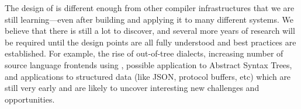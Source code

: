 The design of \MLIR is different enough from other compiler infrastructures that
we are still learning---even after building and applying it to many different
systems. We believe that there is still a lot to discover, and several more
years of research will be required until the design points are all fully
understood and best practices are established. For example, the rise of
out-of-tree dialects, increasing number of source language frontends using
\MLIR, possible application to Abstract Syntax Trees, and applications to
structured data (like JSON, protocol buffers, etc) which are still very early
and are likely to uncover interesting new challenges and opportunities.
